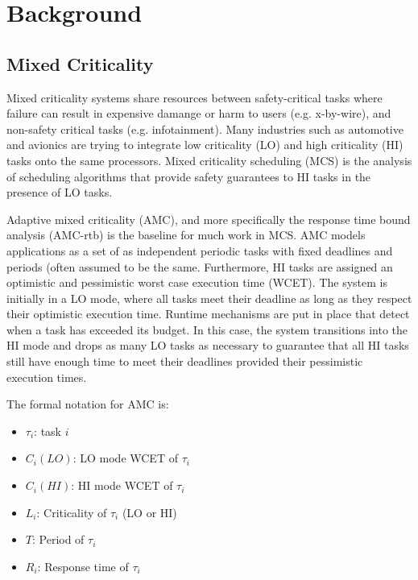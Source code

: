 
\chapter{Background} %

\label{c:background} %


\section{Mixed Criticality}
\label{s:mixedcriticality}
	Mixed criticality systems share resources between safety-critical tasks where failure can result in expensive damange or harm to users (e.g. x-by-wire), and non-safety critical tasks (e.g. infotainment). 
	Many industries such as automotive and avionics are trying to integrate low criticality (LO) and high criticality (HI) tasks onto the same processors.
	Mixed criticality scheduling (MCS) is the analysis of scheduling algorithms that provide safety guarantees to HI tasks in the presence of LO tasks.
	
	Adaptive mixed criticality (AMC), and more specifically the response time bound analysis (AMC-rtb) \cite{baruah2011response} is the baseline for much work in MCS. 
	AMC models applications as a set of as independent periodic tasks with fixed deadlines and periods (often assumed to be the same.
	Furthermore, HI tasks are assigned an optimistic and pessimistic worst case execution time (WCET). 
	The system is initially in a LO mode, where all tasks meet their deadline as long as they respect their optimistic execution time.
	Runtime mechanisms are put in place that detect when a task has exceeded its budget.
	In this case, the system transitions into the HI mode and drops as many LO tasks as necessary to guarantee that all HI tasks still have enough time to meet their deadlines provided their pessimistic execution times. 
	
	The formal notation for AMC is:
	\begin{itemize}
	  \item $\tau_i$: task $i$
	  \item $C_i(LO)$: LO mode WCET of $\tau_i$
	  \item $C_i(HI)$: HI mode WCET of $\tau_i$
	  \item $L_i$: Criticality of $\tau_i$ (LO or HI)
	  \item $T$: Period of $\tau_i$
	  \item $R_i$: Response time of $\tau_i$
	\end{itemize}

